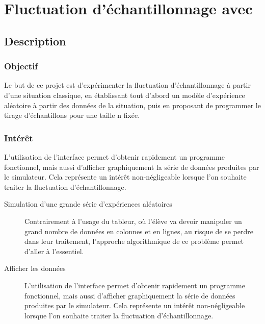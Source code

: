 

\section{Fluctuation d'échantillonnage avec \mb}


\subsection{Description}

\subsubsection{Objectif}


\begin{formule}
Le but de ce projet est d'expérimenter la fluctuation d'échantillonnage à  partir d'une situation classique, en établissant tout d'abord un modèle d'expérience aléatoire à partir des données de la situation, puis en proposant de programmer le tirage d'échantillons pour une taille n fixée.
\end{formule}


\subsubsection{Intérêt}

 L'utilisation de l'interface \mb permet d'obtenir rapidement un programme fonctionnel, mais aussi d'afficher graphiquement la série de données produites par le simulateur. Cela représente un intérêt non-négligeable lorsque l'on souhaite traiter la fluctuation d'échantillonnage.

\begin{description}
    \item [Simulation d'une grande série d'expériences aléatoires] Contrairement à l'usage du tableur, où l'élève va devoir manipuler un grand nombre de données en colonnes et en lignes, au risque de se perdre dans leur traitement, l'approche algorithmique de  ce problème permet d'aller à l'essentiel.
    \item [Afficher les données]
    L'utilisation de l'interface \mb permet d'obtenir rapidement un programme fonctionnel, mais aussi d'afficher graphiquement la série de données produites par le simulateur. Cela représente un intérêt non-négligeable lorsque l'on souhaite traiter la fluctuation d'échantillonnage.
\end{description}


